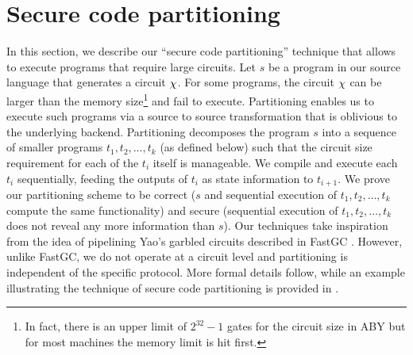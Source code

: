 \section{Secure code partitioning}
\label{sec:pipe}

\newcommand{\prog}{s}
\newcommand{\progn}{t}
\newcommand{\mprog}{u}
\newcommand{\seq}{||}
\newcommand{\stateq}{q}

In this section, we describe our ``secure code partitioning'' technique that
allows \tool to execute programs that require large circuits.
Let $\prog$ be a program in our source language that
generates a circuit $\chi$. For some programs, the circuit $\chi$
can be larger than
the memory size\footnote{In fact, there is
  an upper limit of $2^{32}-1$ gates for the circuit size in ABY but
  for most machines the memory limit is hit first.} and fail to
execute. Partitioning enables us to 
execute such programs via a source to source transformation that is
oblivious to the underlying \mpc backend. Partitioning decomposes the
program $\prog$ into a sequence of smaller \tool programs
$\progn_1,\progn_2,\ldots,\progn_k$ (as defined below) such
that the circuit size
requirement for each of the $\progn_i$ itself is manageable. We compile
and execute each $\progn_i$ sequentially, feeding the outputs of
$\progn_i$ as state
information to $\progn_{i+1}$. We prove our partitioning scheme to be
correct ($\prog$ and sequential execution of $\progn_1,\progn_2,\ldots,\progn_k$ compute
the same functionality) and secure (sequential execution of
$\progn_1,\progn_2,\ldots,\progn_k$ does
not reveal any more information than $\prog$). 
Our techniques take inspiration from the idea of pipelining Yao's garbled circuits described in FastGC \cite{yao-pipe}.
However, unlike FastGC, we do not operate at a circuit level and partitioning is independent of the specific
\mpc protocol. 
%
%
More formal details follow, while an example illustrating the technique of secure code partitioning is provided in  . 

